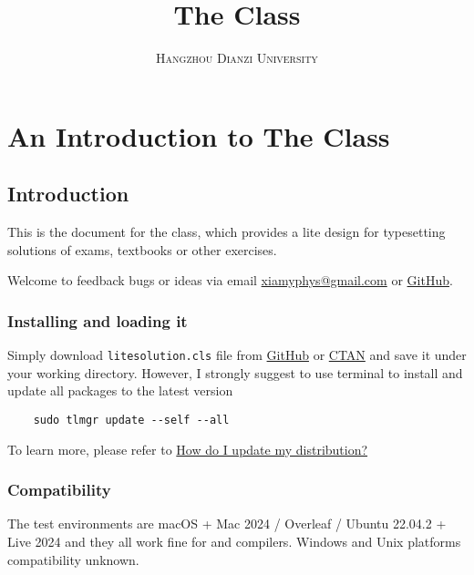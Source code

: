 \documentclass[ans,mtpro2]{litesolution}
\title{\sffamily The \pkg{LiteSolution} Class}
\subtitle{\sffamily\scshape Hangzhou Dianzi University}
\begin{document}
\maketitle[MidnightBlue]

\chapter{An Introduction to The  Class}

\section{Introduction}

This is the document for the  class, which provides a lite design for typesetting solutions of exams, textbooks or other exercises.

Welcome to feedback bugs or ideas via email \href{mailto:xiamyphys@gmail.com}{\ttfamily xiamyphys@gmail.com} or \href{https://github.com/xiamyphys/litesolution}{GitHub}.

\subsection{Installing  and loading it}

Simply download \verb|litesolution.cls| file from \href{https://github.com/xiamyphys/litesolution}{GitHub} or \href{https://ctan.org/pkg/litesolution}{CTAN} and save it under your working directory. However, I strongly suggest to use terminal to install and update all packages to the latest version

\begin{verbatim}
    sudo tlmgr update --self --all
\end{verbatim}

To learn more, please refer to \href{https://tex.stackexchange.com/questions/55437/how-do-i-update-my-tex-distribution}{How do I update my  distribution?}

\subsection{Compatibility}

The test environments are macOS + Mac 2024 / Overleaf / Ubuntu 22.04.2 +  Live 2024 and they all work fine for  and  compilers. Windows and Unix platforms compatibility unknown.
\end{document}
